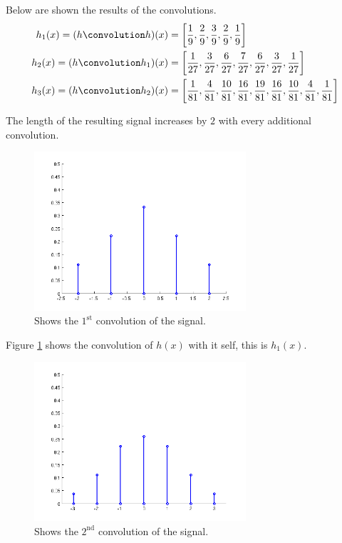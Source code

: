 \documentclass[a4paper, 10pt, final]{article}
\begin{document}
Below are shown the results of the convolutions.
\begin{align*}
h_{1}(x) = (h \convolution h)(x) & = \left[ \frac{1}{9}, \frac{2}{9},\frac{3}{9},\frac{2}{9},\frac{1}{9} \right] \\
h_{2}(x) = (h \convolution h_1)(x) & = \left[ \frac{1}{27}, \frac{3}{27},\frac{6}{27},\frac{7}{27},\frac{6}{27}, \frac{3}{27}, \frac{1}{27} \right] \\
h_{3}(x) = (h \convolution h_2)(x) & = \left[ \frac{1}{81}, \frac{4}{81},\frac{10}{81},\frac{16}{81},\frac{19}{81}, \frac{16}{81}, \frac{10}{81}, \frac{4}{81}, \frac{1}{81} \right]
\end{align*}

The length of the resulting signal increases by $2$ with every additional convolution.

\begin{figure}[H]
  \centering
  \includegraphics[width=0.7\textwidth]{./images/q2_4b}
  \caption{Shows the $1^{\textrm{st}}$ convolution of the signal.}
    \label{fig:q2_4b}
\end{figure}

Figure \ref{fig:q2_4b} shows the convolution of $h(x)$ with it self, this is $h_1(x)$.

\begin{figure}[H]
  \centering
  \includegraphics[width=0.7\textwidth]{./images/q2_4c}
  \caption{Shows the $2^{\textrm{nd}}$ convolution of the signal.}
    \label{fig:q2_4c}
\end{figure}
\end{document}
